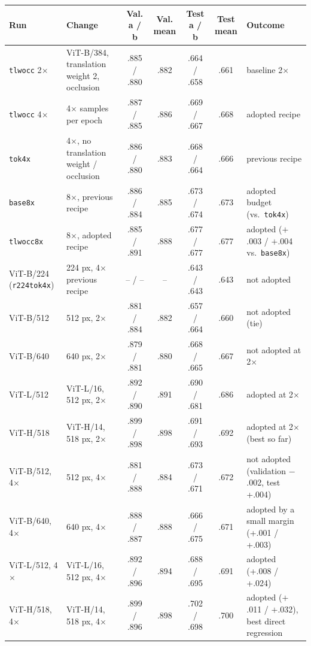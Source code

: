 \begin{table}[t]
  \centering
  \small
  \begin{tabular}{@{}llccccl@{}}
    \toprule
    Run & Change & Val. a / b & Val. mean & Test a / b & Test mean & Outcome \\
    \midrule
    \texttt{tlwocc} 2$\times$ & ViT-B/384, translation weight 2, occlusion & .885 / .880 & .882 & .664 / .658 & .661 & baseline 2$\times$ \\
    \texttt{tlwocc} 4$\times$ & 4$\times$ samples per epoch & .887 / .885 & .886 & .669 / .667 & .668 & adopted recipe \\
    \texttt{tok4x} & 4$\times$, no translation weight / occlusion & .886 / .880 & .883 & .668 / .664 & .666 & previous recipe \\
    \texttt{base8x} & 8$\times$, previous recipe & .886 / .884 & .885 & .673 / .674 & .673 & adopted budget (vs.\ \texttt{tok4x}) \\
    \texttt{tlwocc8x} & 8$\times$, adopted recipe & .885 / .891 & .888 & .677 / .677 & .677 & adopted ($+$.003 / $+$.004 vs.\ \texttt{base8x}) \\
    ViT-B/224 (\texttt{r224tok4x}) & 224 px, 4$\times$ previous recipe & -- / -- & -- & .643 / .643 & .643 & not adopted \\
    ViT-B/512 & 512 px, 2$\times$ & .881 / .884 & .882 & .657 / .664 & .660 & not adopted (tie) \\
    ViT-B/640 & 640 px, 2$\times$ & .879 / .881 & .880 & .668 / .665 & .667 & not adopted at 2$\times$ \\
    ViT-L/512 & ViT-L/16, 512 px, 2$\times$ & .892 / .890 & .891 & .690 / .681 & .686 & adopted at 2$\times$ \\
    ViT-H/518 & ViT-H/14, 518 px, 2$\times$ & .899 / .898 & .898 & .691 / .693 & .692 & adopted at 2$\times$ (best so far) \\
    ViT-B/512, 4$\times$ & 512 px, 4$\times$ & .881 / .888 & .884 & .673 / .671 & .672 & not adopted (validation $-$.002, test +.004) \\
    ViT-B/640, 4$\times$ & 640 px, 4$\times$ & .888 / .887 & .888 & .666 / .675 & .671 & adopted by a small margin (+.001 / +.003) \\
    ViT-L/512, 4$\times$ & ViT-L/16, 512 px, 4$\times$ & .892 / .896 & .894 & .688 / .695 & .691 & adopted (+.008 / +.024) \\
    ViT-H/518, 4$\times$ & ViT-H/14, 518 px, 4$\times$ & .899 / .896 & .898 & .702 / .698 & .700 & adopted ($+$.011 / $+$.032), best direct regression \\

\end{tabular}
\end{table}

